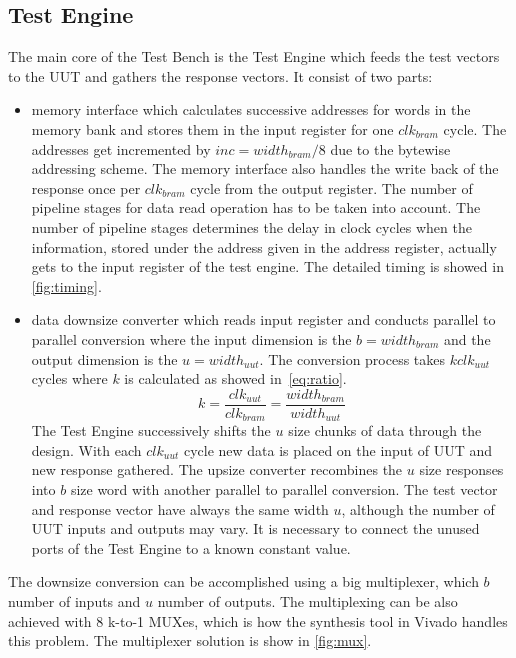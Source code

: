 \subsection{Test Engine}\label{ssec:engine}
The main core of the Test Bench is the Test Engine which feeds the test vectors to the UUT and gathers the response vectors. It consist of two parts:
\begin{itemize}
    \item memory interface which calculates successive addresses for words in the memory bank and stores them in the input register for one $clk_{bram}$ cycle. The addresses get incremented by $inc = width_{bram}/8$ due to the bytewise addressing scheme. The memory interface also handles the write back of the response once per $clk_{bram}$ cycle from the output register. The number of pipeline stages for data read operation has to be taken into account. The number of pipeline stages determines the delay in clock cycles when the information, stored under the address given in the address register, actually gets to the input register of the test engine. The detailed timing is showed in \autoref{fig:timing}.
    \item data downsize converter which reads input register and conducts parallel to parallel conversion where the input dimension is the $b=width_{bram}$ and the output dimension is the $u=width_{uut}$. The conversion process takes $k clk_{uut}$ cycles where $k$ is calculated as showed in~\autoref{eq:ratio}.
    \begin{equation}\label{eq:ratio}
    k = \frac{clk_{uut}}{clk_{bram}} = \frac{width_{bram}}{width_{uut}}
    \end{equation}
    The Test Engine successively shifts the $u$ size chunks of data through the design. With each $clk_{uut}$ cycle new data is placed on the input of UUT and new response gathered. The upsize converter recombines the $u$ size responses into $b$ size word with another parallel to parallel conversion. The test vector and response vector have always the same width $u$, although the number of UUT inputs and outputs may vary. It is necessary to connect the unused ports of the Test Engine to a known constant value.
\end{itemize}
The downsize conversion can be accomplished using a big multiplexer, which $b$ number of inputs and $u$ number of outputs. The multiplexing can be also achieved with 8 k-to-1 MUXes, which is how the synthesis tool in Vivado handles this problem. The multiplexer solution is show in \autoref{fig:mux}.

